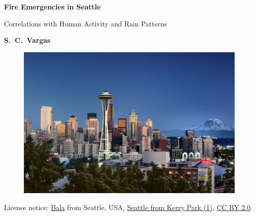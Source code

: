 \documentclass[12pt,a4paper]{article}
\date{}
\begin{document}
\thispagestyle{empty}

\begin{center}

\textsf{}

\vskip 1.2cm

{\LARGE \bf Fire Emergencies in Seattle}

\vskip 0.1cm

{\Large Correlations with Human Activity and Rain Patterns}
 

\vskip 0.75cm

{\bf \large S.~C.~Vargas}



\end{center}

\vskip 1cm


\begin{figure}[ht!]
\centering
\includegraphics[scale=0.5]{figs/Seattle_Pic.jpg}
\label{pic}
\end{figure}
\vspace{-0.8cm}
\begin{center}
{\small License notice: \href{https://www.flickr.com/people/43518209@N00}{Bala} from Seattle, USA, \href{https://commons.wikimedia.org/wiki/File:Seattle_from_Kerry_Park_(1).jpg}{Seattle from Kerry Park (1)}, \href{https://creativecommons.org/licenses/by/2.0/legalcode}{CC BY 2.0}.}
\end{center}
\end{document}
